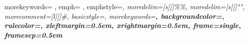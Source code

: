 {
  morekeywords= {
	},
  emph={
  },
  emphstyle=\em,
  moredelim=[s][\color{blue}]{\%}{\%},
  moredelim=[s][\color{seagreen}]{"}{"},
  morecomment=[l][\color{medium-marroon}\itshape]{\#},
  basicstyle=\ttfamily\footnotesize,
  morekeywords=\bfseries,
  backgroundcolor=\color{light-pink},
  rulecolor=\color{light-pink},
  xleftmargin=0.5em,
  xrightmargin=0.5em,
  frame=single,
  framesep=0.5em
}
